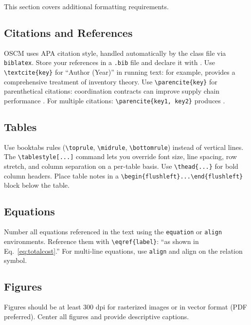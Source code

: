 \documentclass[preprint]{oscmjournal}
\begin{document}
This section covers additional formatting requirements.

\subsection{Citations and References}

OSCM uses APA citation style, handled automatically by the class file via \texttt{biblatex}.
Store your references in a \texttt{.bib} file and declare it with \verb||.
Use \verb|\textcite{key}| for ``Author (Year)'' in running text: for example, \textcite{zipkin2000foundations} provides a comprehensive treatment of inventory theory.
Use \verb|\parencite{key}| for parenthetical citations: coordination contracts can improve supply chain performance \parencite{nandi2016dynamics}.
For multiple citations: \verb|\parencite{key1, key2}| produces \parencite{cachon2000supply, lee1997bullwhip}.

\subsection{Tables}

Use booktabs rules (\verb|\toprule|, \verb|\midrule|, \verb|\bottomrule|) instead of vertical lines.
The \verb|\tablestyle[...]| command lets you override font size, line spacing, row stretch, and column separation on a per-table basis.
Use \verb|\thead{...}| for bold column headers.
Place table notes in a \verb|\begin{flushleft}...\end{flushleft}| block below the table.

\subsection{Equations}

Number all equations referenced in the text using the \texttt{equation} or \texttt{align} environments.
Reference them with \verb|\eqref{label}|: ``as shown in Eq.~\eqref{eq:totalcost}.''
For multi-line equations, use \texttt{align} and align on the relation symbol.

\subsection{Figures}

Figures should be at least 300 dpi for rasterized images or in vector format (PDF preferred).
Center all figures and provide descriptive captions.
\end{document}
